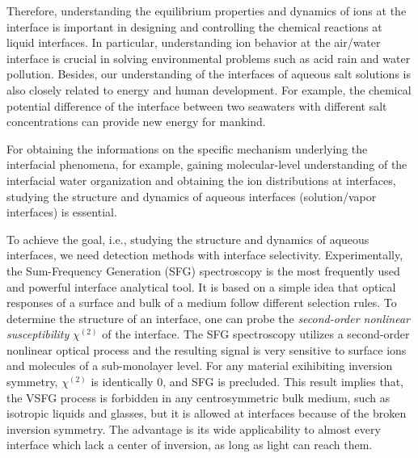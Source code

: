 Therefore, understanding the equilibrium properties and dynamics of ions at the interface is important in designing and controlling the chemical reactions at liquid interfaces\cite{Chang06}. In particular, understanding ion behavior at the air/water interface is crucial in solving environmental problems such as acid rain and water pollution\cite{Chang06}.
Besides, our understanding of the interfaces of aqueous salt solutions is also closely related to energy and human development. 
For example, the chemical potential difference of the interface between two seawaters with different salt concentrations can provide new energy for mankind\cite{Pattle1954,Loeb1976}. 

For obtaining the informations on the specific mechanism underlying the interfacial phenomena, for example,
gaining molecular-level understanding of the interfacial water organization and obtaining the ion distributions at interfaces,
studying the structure and dynamics of aqueous interfaces (solution/vapor interfaces) is essential.

To achieve the goal, i.e., studying the structure and dynamics of aqueous interfaces, we need detection methods with interface selectivity. 
Experimentally, the Sum-Frequency Generation (SFG) spectroscopy is the most frequently used and powerful interface  analytical tool\cite{Shen2016,Morita2018,Shen2020}.
It is based on a simple idea that optical responses of a surface and bulk of a medium follow different selection rules.
To determine the structure of an interface, one can probe the \emph{second-order nonlinear susceptibility} $\chi^{(2)}$ of 
the interface\cite{Shen84,Guyot-Sionnest1986,Shen2020}.
The SFG spectroscopy utilizes a second-order nonlinear optical process and the resulting signal is very sensitive to surface ions and 
molecules of a sub-monolayer level\cite{Morita2008,WangHongFei2015,WenYuChieh2016,Ishiyama2017,Penalber-Johnstone2018}. 
%
For any material exihibiting inversion symmetry, $\chi^{(2)}$ is identically 0, and SFG is precluded.
This result implies that, the VSFG process is forbidden in any centrosymmetric bulk medium\cite{Che2012},
such as isotropic liquids and glasses, but it is allowed at interfaces because of the broken inversion symmetry\cite{PF00}.
The advantage is its wide applicability to almost every interface which lack a center of inversion, as long as light can reach them. 

